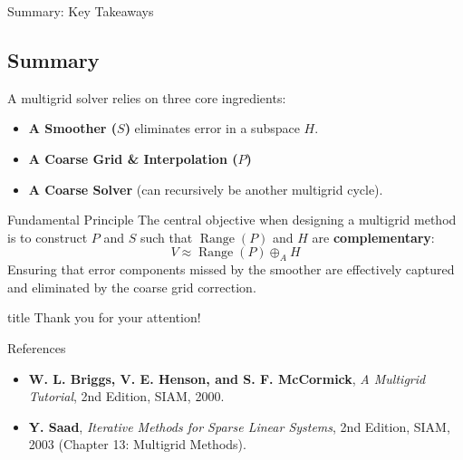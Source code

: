 \documentclass{beamer}
\DeclareMathOperator{\range}{Range}
\begin{document}
\begin{frame}{Summary: Key Takeaways}
\subsection*{Summary}

A multigrid solver relies on three core ingredients:
\begin{itemize}
    \item \textbf{A Smoother ($S$)} eliminates error in a subspace $H$.
    \item \textbf{A Coarse Grid \& Interpolation ($P$)}
    \item \textbf{A Coarse Solver} (can recursively be another multigrid cycle).
\end{itemize}

\vspace{1em}
\begin{block}{Fundamental Principle}
The central objective when designing a multigrid method is to construct $P$ and $S$ such that $\range(P)$ and $H$ are \textbf{complementary}:
\[
    V \approx \range(P) \oplus_A H
\]
Ensuring that error components missed by the smoother are effectively captured and eliminated by the coarse grid correction.
\end{block}
\end{frame}

\begin{frame}[plain]
\vfill
\centering
\begin{beamercolorbox}[sep=8pt,center,shadow=true,rounded=true]{title}
    \Huge Thank you for your attention!\par
\end{beamercolorbox}

\vspace{3em}

\begin{block}{References}
\small
\begin{itemize}
    \item \textbf{W. L. Briggs, V. E. Henson, and S. F. McCormick}, \textit{A Multigrid Tutorial}, 2nd Edition, SIAM, 2000.
    \item \textbf{Y. Saad}, \textit{Iterative Methods for Sparse Linear Systems}, 2nd Edition, SIAM, 2003 (Chapter 13: Multigrid Methods).
\end{itemize}
\end{block}

\vfill

\end{frame}
\end{document}
